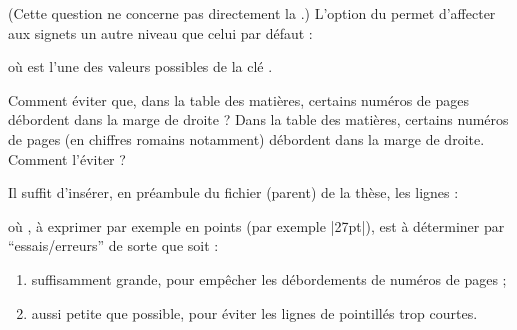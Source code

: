 (Cette question ne concerne pas directement la \yatCl{}.) L'option
 du  permet d'affecter aux signets un autre
niveau que celui par défaut :
\begin{preamblecode}[title=Par exemple dans le \File{\configurationfile}]
\end{preamblecode}
où  est l'une des valeurs possibles de la clé .

\begin{dbfaq}{Comment éviter que, dans la table des matières, certains numéros
    de pages débordent dans la marge de droite ?}{}
  Dans la table des matières, certains numéros de pages (en chiffres romains
  notamment) débordent dans la marge de droite. Comment l'éviter ?
\end{dbfaq}

Il suffit d'insérer, en préambule du fichier (parent) de la thèse, les lignes :
\begin{preamblecode}[title=Par exemple dans le \File{\configurationfile}]
\makeatletter
\renewcommand*\@pnumwidth{"\meta{distance}"}
\makeatother
\end{preamblecode}
où , à exprimer par exemple en points (par exemple |27pt|), est
à déterminer par \enquote{essais/erreurs} de sorte que  soit :
\begin{enumerate}
\item suffisamment grande, pour empêcher les débordements de numéros de pages ;
\item aussi petite que possible, pour éviter les lignes de pointillés trop
  courtes.
\end{enumerate}

\subsection[Titres
courants]{\texorpdfstring{}{Titres courants}}
\label{sec-titres-courants}

